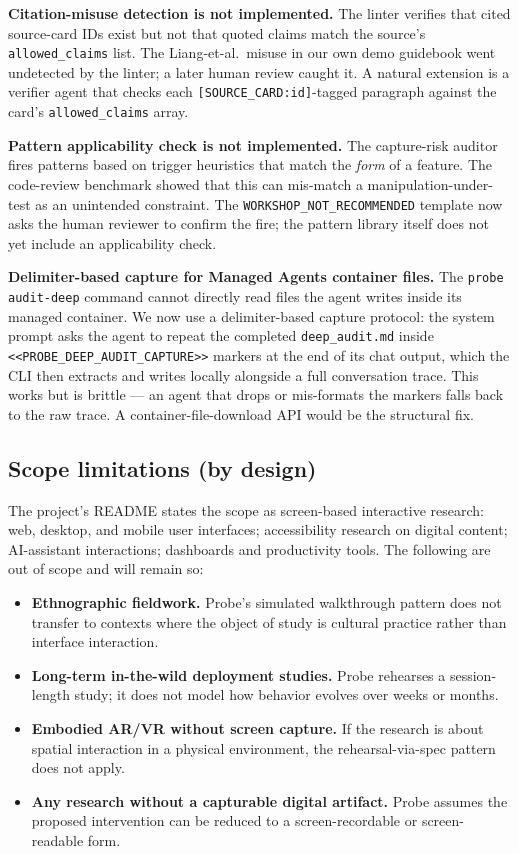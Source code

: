 \textbf{Citation-misuse detection is not implemented.} The linter verifies that cited source-card IDs exist but not that quoted claims match the source's \texttt{allowed\_claims} list. The Liang-et-al.\ misuse in our own demo guidebook went undetected by the linter; a later human review caught it. A natural extension is a verifier agent that checks each \texttt{[SOURCE\_CARD:id]}-tagged paragraph against the card's \texttt{allowed\_claims} array.

\textbf{Pattern applicability check is not implemented.} The capture-risk auditor fires patterns based on trigger heuristics that match the \emph{form} of a feature. The code-review benchmark showed that this can mis-match a manipulation-under-test as an unintended constraint. The \texttt{WORKSHOP\_NOT\_RECOMMENDED} template now asks the human reviewer to confirm the fire; the pattern library itself does not yet include an applicability check.

\textbf{Delimiter-based capture for Managed Agents container files.} The \texttt{probe audit-deep} command cannot directly read files the agent writes inside its managed container. We now use a delimiter-based capture protocol: the system prompt asks the agent to repeat the completed \texttt{deep\_audit.md} inside \texttt{<<PROBE\_DEEP\_AUDIT\_CAPTURE>>} markers at the end of its chat output, which the CLI then extracts and writes locally alongside a full conversation trace. This works but is brittle — an agent that drops or mis-formats the markers falls back to the raw trace. A container-file-download API would be the structural fix.

\subsection{Scope limitations (by design)}

The project's README states the scope as screen-based interactive research: web, desktop, and mobile user interfaces; accessibility research on digital content; AI-assistant interactions; dashboards and productivity tools. The following are out of scope and will remain so:

\begin{itemize}
    \item \textbf{Ethnographic fieldwork.} Probe's simulated walkthrough pattern does not transfer to contexts where the object of study is cultural practice rather than interface interaction.
    \item \textbf{Long-term in-the-wild deployment studies.} Probe rehearses a session-length study; it does not model how behavior evolves over weeks or months.
    \item \textbf{Embodied AR/VR without screen capture.} If the research is about spatial interaction in a physical environment, the rehearsal-via-spec pattern does not apply.
    \item \textbf{Any research without a capturable digital artifact.} Probe assumes the proposed intervention can be reduced to a screen-recordable or screen-readable form.
\end{itemize}

